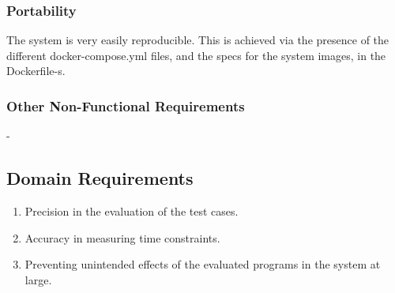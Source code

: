 \subsubsection{Portability}
The system is very easily reproducible. This is achieved via the presence of the different docker-compose.yml files, and the specs for the system images, in the Dockerfile-s.

\subsubsection{Other Non-Functional Requirements}
-

\subsection{Domain Requirements}
\begin{enumerate}
    \item Precision in the evaluation of the test cases.
    \item Accuracy in measuring time constraints.
    \item Preventing unintended effects of the evaluated programs in the system at large.
\end{enumerate}